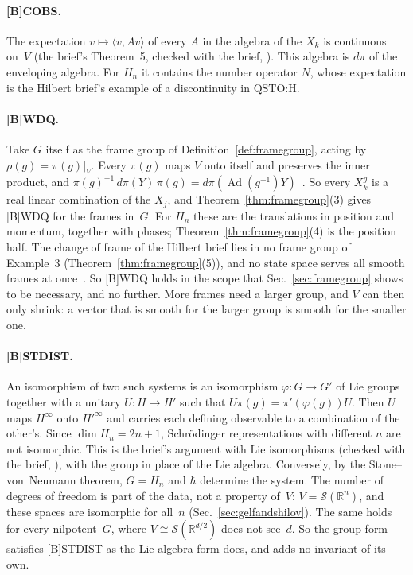 \documentclass[11pt]{article}
\theoremstyle{definition}
\begin{document}
\paragraph{[B]COBS.} The expectation $v \mapsto \langle v, Av\rangle$ of every $A$ in the algebra
of the $X_k$ is continuous on~$V$ (the brief's Theorem~5, checked with the brief,
). This algebra is $d\pi$ of the
enveloping algebra. For $H_n$ it contains the number operator $N$, whose expectation is the
Hilbert brief's example of a discontinuity in QSTO:H.

\paragraph{[B]WDQ.} Take $G$ itself as the frame group of Definition~\ref{def:framegroup}, acting
by $\rho(g) = \pi(g)|_V$. Every $\pi(g)$ maps $V$ onto itself and preserves the inner product,
and $\pi(g)^{-1}\,d\pi(Y)\,\pi(g) = d\pi(\operatorname{Ad}(g^{-1})Y)$~\cite[Sec.~3]{goodman}. So
every $X_k^g$ is a real linear combination of the $X_j$, and Theorem~\ref{thm:framegroup}(3)
gives [B]WDQ for the frames in~$G$. For $H_n$ these are the translations in position and
momentum, together with phases; Theorem~\ref{thm:framegroup}(4) is the position half. The change
of frame of the Hilbert brief lies in no frame group of Example~3
(Theorem~\ref{thm:framegroup}(5)), and no state space serves all smooth frames at
once~\cite[Sec.~2]{further-hilbert}. So [B]WDQ holds in the scope that Sec.~\ref{sec:framegroup}
shows to be necessary, and no further. More frames need a larger group, and $V$ can then only
shrink: a vector that is smooth for the larger group is smooth for the smaller one.

\paragraph{[B]STDIST.} An isomorphism of two such systems is an isomorphism
$\varphi\colon G \to G'$ of Lie groups together with a unitary $U\colon H \to H'$ such that
$U\pi(g) = \pi'(\varphi(g))U$. Then $U$ maps $H^\infty$ onto $H'^\infty$ and carries each defining
observable to a combination of the other's. Since $\dim H_n = 2n + 1$, Schr\"odinger
representations with different $n$ are not isomorphic. This is the brief's argument with Lie
isomorphisms (checked with the brief, ),
with the group in place of the Lie algebra. Conversely, by the Stone--von~Neumann theorem, $G = H_n$
and $\hbar$ determine the system. The number of degrees of freedom is part of the data, not a
property of~$V$: $V = \mathcal S(\mathbb R^n)$, and these spaces are isomorphic for all~$n$
(Sec.~\ref{sec:gelfandshilov}). The same holds for every nilpotent~$G$, where
$V \cong \mathcal S(\mathbb R^{d/2})$ does not see~$d$. So the group form satisfies [B]STDIST as
the Lie-algebra form does, and adds no invariant of its own.
\end{document}
